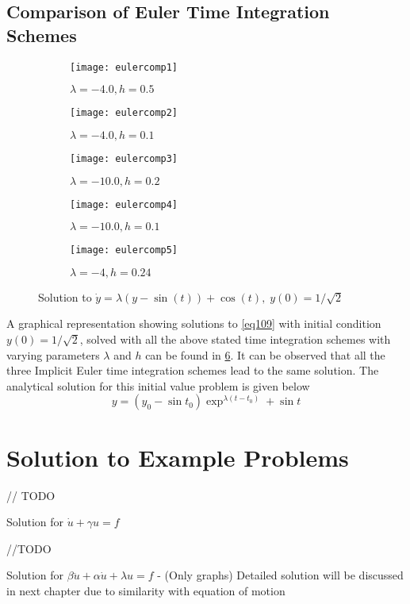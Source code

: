 \subsection{Comparison of Euler Time Integration Schemes}
\begin{figure}[h]
\begin{subfigure}{0.5\textwidth}
\texttt{[image: eulercomp1]} 
\caption{$\lambda = -4.0, h = 0.5$}
\label{fig:eulercomp1}
\end{subfigure}
\begin{subfigure}{0.5\textwidth}
\texttt{[image: eulercomp2]}
\caption{$\lambda = -4.0, h = 0.1$}
\label{fig:eulercomp2}
\end{subfigure}
\begin{subfigure}{0.5\textwidth}
\texttt{[image: eulercomp3]} 
\caption{$\lambda = -10.0, h = 0.2$}
\label{fig:eulercomp3}
\end{subfigure}
\begin{subfigure}{0.5\textwidth}
\texttt{[image: eulercomp4]}
\caption{$\lambda = -10.0, h = 0.1$}
\label{fig:eulercomp4}
\end{subfigure}
\begin{subfigure}{\textwidth}
\texttt{[image: eulercomp5]} 
\caption{$\lambda = -4, h = 0.24$}
\label{fig:eulercomp5}
\end{subfigure}
\caption{Solution to $\dot{y} = \lambda (y - \sin(t)) + \cos(t),\; y(0) = 1/\sqrt{2}$}
\label{fig:eulerComparison}
\end{figure}
A graphical representation showing solutions to \cref{eq109} with initial condition $y(0) = 1/\sqrt{2}$, solved with all the above stated time integration schemes with varying parameters $\lambda$ and $h$ can be found in \cref{fig:eulerComparison}. It can be observed that all the three Implicit Euler time integration schemes lead to the same solution. The analytical solution for this initial value problem is given below
\begin{equation}
\label{eq117}
y = (y_0 - \sin t_0)\exp^{\lambda(t-t_0)} + \sin t
\end{equation}


\section{Solution to Example Problems}

// TODO

Solution for $\dot{u} + \gamma u = f$

//TODO

Solution for $\beta \ddot{u} + \alpha \dot{u} + \lambda {u} = f$ - (Only graphs)
Detailed solution will be discussed in next chapter due to similarity with equation of motion
